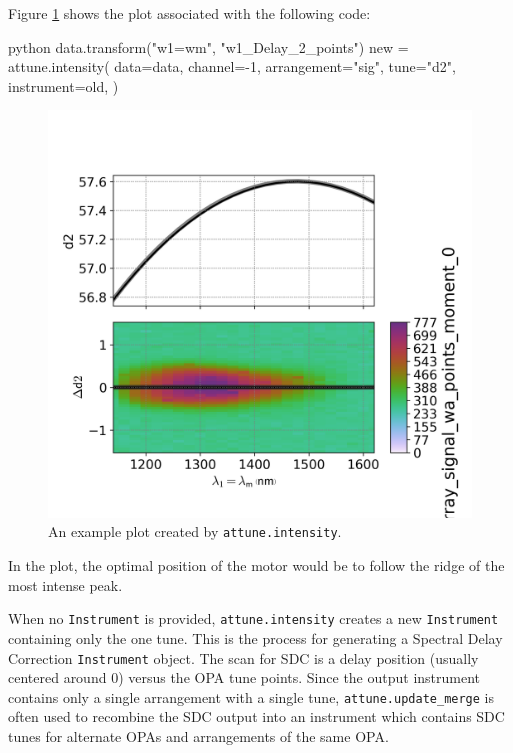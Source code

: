 Figure \ref{rep:fig:intensity} shows the plot associated with the following code:

\begin{codefragment}{python}
data.transform("w1=wm", "w1_Delay_2_points")
new = attune.intensity(
     data=data,
     channel=-1,
     arrangement="sig",
     tune="d2",
     instrument=old,
)
\end{codefragment}

\begin{figure}
\includegraphics{representation/images/intensity.png}
\caption[Intensity]{
	An example plot created by \texttt{attune.intensity}.
}

\label{rep:fig:intensity}
\end{figure}

In the plot, the optimal position of the motor would be to follow the
ridge of the most intense peak.

When no \texttt{Instrument} is provided,
\texttt{attune.intensity} creates a new
\texttt{Instrument} containing only the one
tune. This is the process for generating a Spectral Delay Correction
\texttt{Instrument} object. The scan for SDC is a delay position
(usually centered around 0) versus the OPA tune points. Since the output
instrument contains only a single arrangement with a single tune,
\texttt{attune.update\_merge} is often used to
recombine the SDC output into an instrument which contains SDC tunes for
alternate OPAs and arrangements of the same OPA.


